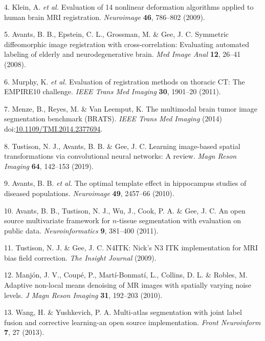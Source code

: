 \documentclass[12pt,]{article}
\begin{document}
\leavevmode\hypertarget{ref-Klein:2009aa}{}%
4. Klein, A. \emph{et al.} Evaluation of 14 nonlinear deformation
algorithms applied to human brain MRI registration. \emph{Neuroimage}
\textbf{46}, 786--802 (2009).

\leavevmode\hypertarget{ref-Avants:2008aa}{}%
5. Avants, B. B., Epstein, C. L., Grossman, M. \& Gee, J. C. Symmetric
diffeomorphic image registration with cross-correlation: Evaluating
automated labeling of elderly and neurodegenerative brain. \emph{Med
Image Anal} \textbf{12}, 26--41 (2008).

\leavevmode\hypertarget{ref-Murphy:2011aa}{}%
6. Murphy, K. \emph{et al.} Evaluation of registration methods on
thoracic CT: The EMPIRE10 challenge. \emph{IEEE Trans Med Imaging}
\textbf{30}, 1901--20 (2011).

\leavevmode\hypertarget{ref-Menze:2014aa}{}%
7. Menze, B., Reyes, M. \& Van Leemput, K. The multimodal brain tumor
image segmentation benchmark (BRATS). \emph{IEEE Trans Med Imaging}
(2014)
doi:\href{https://doi.org/10.1109/TMI.2014.2377694}{10.1109/TMI.2014.2377694}.

\leavevmode\hypertarget{ref-Tustison:2019ab}{}%
8. Tustison, N. J., Avants, B. B. \& Gee, J. C. Learning image-based
spatial transformations via convolutional neural networks: A review.
\emph{Magn Reson Imaging} \textbf{64}, 142--153 (2019).

\leavevmode\hypertarget{ref-Avants:2010aa}{}%
9. Avants, B. B. \emph{et al.} The optimal template effect in
hippocampus studies of diseased populations. \emph{Neuroimage}
\textbf{49}, 2457--66 (2010).

\leavevmode\hypertarget{ref-Avants:2011aa}{}%
10. Avants, B. B., Tustison, N. J., Wu, J., Cook, P. A. \& Gee, J. C. An
open source multivariate framework for \(n\)-tissue segmentation with
evaluation on public data. \emph{Neuroinformatics} \textbf{9}, 381--400
(2011).

\leavevmode\hypertarget{ref-Tustison2009e}{}%
11. Tustison, N. J. \& Gee, J. C. N4ITK: Nick's N3 ITK implementation
for MRI bias field correction. \emph{The Insight Journal} (2009).

\leavevmode\hypertarget{ref-Manjon:2010aa}{}%
12. Manjón, J. V., Coupé, P., Martí-Bonmatí, L., Collins, D. L. \&
Robles, M. Adaptive non-local means denoising of MR images with
spatially varying noise levels. \emph{J Magn Reson Imaging} \textbf{31},
192--203 (2010).

\leavevmode\hypertarget{ref-Wang:2013aa}{}%
13. Wang, H. \& Yushkevich, P. A. Multi-atlas segmentation with joint
label fusion and corrective learning-an open source implementation.
\emph{Front Neuroinform} \textbf{7}, 27 (2013).
\end{document}
